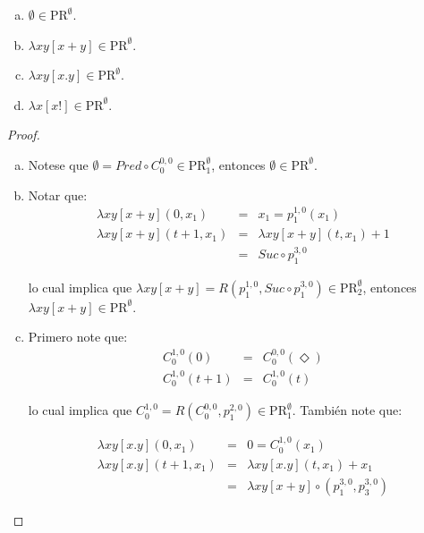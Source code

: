   \begin{lemma}
    \begin{enumerate}[a)]
      \item $\emptyset \in \mathrm{PR}^{\emptyset}$.
      \item $\lambda xy \left[x+y\right] \in \mathrm{PR}^{\emptyset}$.
      \item $\lambda xy\left[x.y\right] \in \mathrm{PR}^{\emptyset}$.
      \item $\lambda x\left[x!\right] \in \mathrm{PR}^{\emptyset}$.
    \end{enumerate}
  \end{lemma}
  \begin{proof}
    \begin{enumerate}[a)]
      \item Notese que $\emptyset = Pred \circ C_{0}^{0,0} \in \mathrm{PR}_{1}^{\emptyset}$, entonces $\emptyset \in
        \mathrm{PR}^{\emptyset}$.

      \item Notar que:
        \begin{eqnarray*}
          \lambda xy \left[x+y\right](0, x_{1}) &=& x_{1} = p_{1}^{1,0}(x_{1}) \\
          \lambda xy \left[x+y\right](t+1, x_{1}) &=& \lambda xy \left[x+y\right](t, x_{1}) + 1 \\
          & =& Suc \circ p_{1}^{3,0}
        \end{eqnarray*}

        \PN lo cual implica que $\lambda xy \left[x+y\right] = R(p_{1}^{1,0}, Suc \circ p_{1}^{3,0}) \in
        \mathrm{PR}_{2}^{\emptyset}$, entonces $\lambda xy \left[x+y\right] \in \mathrm{PR}^{\emptyset}$.

      \item Primero note que:
        \begin{eqnarray*}
          C_{0}^{1,0}(0) &=& C_{0}^{0,0}(\Diamond) \\
          C_{0}^{1,0}(t+1) &=& C_{0}^{1,0}(t)
        \end{eqnarray*}

        \PN lo cual implica que $C_{0}^{1,0} = R(C_{0}^{0,0}, p_{1}^{2,0}) \in \mathrm{PR}_{1}^{\emptyset}$.
        \PN También note que:

        \begin{eqnarray*}
          \lambda xy \left[x.y\right](0, x_{1}) &=& 0 = C_{0}^{1,0}(x_{1}) \\
          \lambda xy \left[x.y\right](t+1, x_{1}) &=& \lambda xy \left[x.y\right](t, x_{1}) + x_{1} \\
          &=& \lambda xy \left[x+y\right] \circ (p_{1}^{3,0}, p_{3}^{3,0})
        \end{eqnarray*}


\end{enumerate}
\end{proof}
